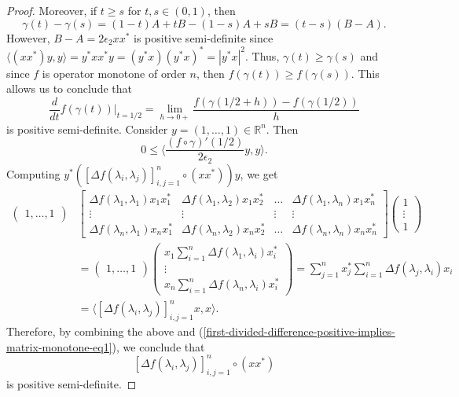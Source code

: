\documentclass[10pt,a4paper]{amsart}
\newcommand{\myabs}[1]{ | #1 | }
\newcommand{\myinnerproduct}[2]{ \langle #1, #2 \rangle }
\begin{document}
\begin{proof}
		Moreover, if $t \geq s$ for $t, s \in (0,1)$, then 
		\[  \gamma(t) - \gamma(s) =  (1-t)A + tB - (1-s)A + sB   = (t-s)(B-A).  \]
		However, $B-A = 2 \epsilon_2 xx^{*}$ is positive semi-definite since $\myinnerproduct{(xx^{*})y}{y} = y^{*}xx^{*}y = (y^{*}x)(y^{*}x)^{*} = \myabs{y^{*}x}^{2}$. Thus,  $\gamma(t) \geq \gamma(s)$ and since $f$ is operator monotone of order $n$, then $f(\gamma(t)) \geq f(\gamma(s))$. This allows us to conclude that
		\[ \frac{d}{dt} f(\gamma(t)) \vert_{t=1/2} = \lim_{h \rightarrow 0+} \frac{f(\gamma(1/2 + h)) - f(\gamma(1/2))}{h} \]
		is positive semi-definite. Consider $y = (1, \ldots, 1) \in \mathbb{R}^{n}$. Then 
		\begin{equation}\label{first-divided-difference-positive-implies-matrix-monotone-eq1}
			0 \leq \bigg \langle \frac{(f \circ \gamma)'(1/2)}{2 \epsilon_2} y, y  \bigg \rangle . 
		\end{equation}
		Computing $y^{*}([\Delta f(\lambda_i, \lambda_j)]_{i,j=1}^{n} \circ (x x^{*}))y$, we get
		\begin{align*}
			\begin{pmatrix}
				1, \ldots, 1
			\end{pmatrix} 
			&\begin{bmatrix}
				\Delta f(\lambda_1, \lambda_1) x_1 x^{*}_1 & \Delta f(\lambda_1, \lambda_2) x_1 x^{*}_2 & \ldots & \Delta f(\lambda_1, \lambda_n) x_1 x^{*}_n \\
				\vdots & \vdots & \vdots & \vdots \\
				\Delta f(\lambda_n, \lambda_1) x_n x^{*}_1 & \Delta f(\lambda_n, \lambda_2) x_n x^{*}_2 & \ldots & \Delta f(\lambda_n, \lambda_n) x_n x^{*}_n
			\end{bmatrix}
			\begin{pmatrix}
				1 \\
				\vdots \\
				1
			\end{pmatrix} 
			\\
			&= 		
			\begin{pmatrix}
				1, \ldots, 1
			\end{pmatrix} 
			\begin{pmatrix}
				x_1 \sum_{i=1}^{n} \Delta f(\lambda_1, \lambda_i) x^{*}_i \\
				\vdots \\
				x_n \sum_{i=1}^{n} \Delta f(\lambda_n, \lambda_i) x^{*}_i
			\end{pmatrix} 
			= \sum_{j=1}^{n} x^{*}_j \sum_{i=1}^{n} \Delta f(\lambda_j, \lambda_i) x_i
			\\
			&= \myinnerproduct{[\Delta f(\lambda_i, \lambda_j)]_{i,j=1}^{n} x}{x}.
		\end{align*}		
		Therefore, by combining the above and (\ref{first-divided-difference-positive-implies-matrix-monotone-eq1}), we conclude that \[[\Delta f(\lambda_i, \lambda_j)]_{i,j=1}^{n} \circ (x x^{*}) \] is positive semi-definite.
	\end{proof}
\end{document}
